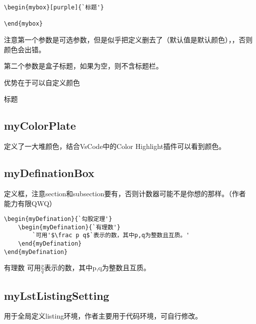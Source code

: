 \documentclass{ctexart}
\begin{document}
    \begin{lstlisting}
\begin{mybox}[purple]{`标题'}

\end{mybox}
    \end{lstlisting}

    注意第一个参数是可选参数，但是似乎把定义删去了（默认值是默认颜色），，否则颜色会出错。

    第二个参数是盒子标题，如果为空，则不含标题栏。
    
    优势在于可以自定义颜色
    \begin{mybox}[purple]{标题}

    \end{mybox}

    \subsection{myColorPlate}
    
    定义了一大堆颜色，结合VsCode中的Color Highlight插件可以看到颜色。

    \subsection{myDefinationBox}
    
    
    定义框，注意section和subsection要有，否则计数器可能不是你想的那样。（作者能力有限QWQ）

    
    \begin{lstlisting}
\begin{myDefination}{`勾股定理'}
    \begin{myDefination}{`有理数'}
        `可用'$\frac p q$`表示的数，其中p,q为整数且互质。'
    \end{myDefination}
\end{myDefination}
    \end{lstlisting}
    
    \begin{myDefination}{有理数}
        可用$\frac p q$表示的数，其中p,q为整数且互质。
    \end{myDefination}
    
    \subsection{myLstListingSetting}
    
    用于全局定义listing环境，作者主要用于代码环境，可自行修改。
\end{document}
